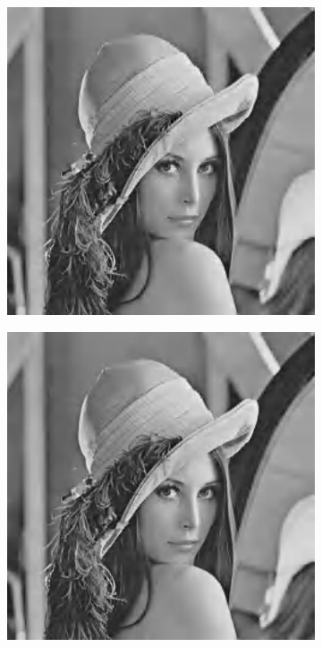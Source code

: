 \documentclass{article}
\begin{document}
\begin{figure}[htbp]
\begin{subfigure}{.19\textwidth}
    \end{subfigure}
    \begin{subfigure}{.19\textwidth}
        \includegraphics[width=\linewidth]{img/jpeg2000/60.jpg}
    \end{subfigure}
    \begin{subfigure}{.19\textwidth}
        \includegraphics[width=\linewidth]{img/jpeg2000/70.jpg}

\end{subfigure}
\end{figure}
\end{document}
